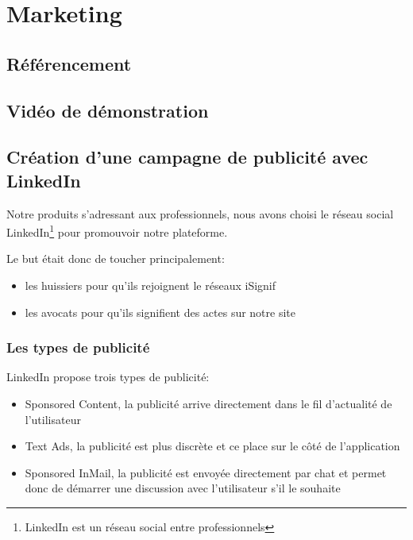 \documentclass[]{report}
\begin{document}

\chapter{Marketing}

  \section{Référencement}

  \section{Vidéo de démonstration}

  \section{Création d'une campagne de publicité avec LinkedIn}

    Notre produits s’adressant aux professionnels, nous avons choisi le réseau social LinkedIn\footnote{LinkedIn est un réseau social entre professionnels} pour promouvoir notre plateforme.

    Le but était donc de toucher principalement:

    \begin{itemize}
        \item les huissiers pour qu'ils rejoignent le réseaux iSignif
        \item les avocats pour qu'ils signifient des actes sur notre site
    \end{itemize}

    \subsection{Les types de publicité}

      LinkedIn propose trois types de publicité:

      \begin{itemize}
        \item Sponsored Content, la publicité arrive directement dans le fil d'actualité de l'utilisateur
        \item Text Ads, la publicité est plus discrète et ce place sur le côté de l'application
        \item Sponsored InMail, la publicité est envoyée directement par chat et permet donc de démarrer une discussion avec l'utilisateur s'il le souhaite
      \end{itemize}
\end{document}
